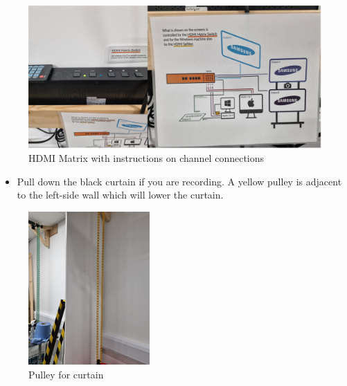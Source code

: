 \documentclass[
]{book}
\providecommand{\tightlist}{%
  \setlength{\itemsep}{0pt}\setlength{\parskip}{0pt}}
\begin{document}
\begin{figure}

{\centering \includegraphics[width=1\linewidth]{HDMI_matrix} 

}

\caption{HDMI Matrix with instructions on channel connections}\label{fig:matrix}
\end{figure}

\begin{itemize}
\tightlist
\item
  Pull down the black curtain if you are recording. A yellow pulley is adjacent to the left-side wall which will lower the curtain.
\end{itemize}

\begin{figure}

{\centering \includegraphics[width=0.6\linewidth]{Pulley} 

}

\caption{Pulley for curtain}\label{fig:curtain}
\end{figure}
\end{document}
